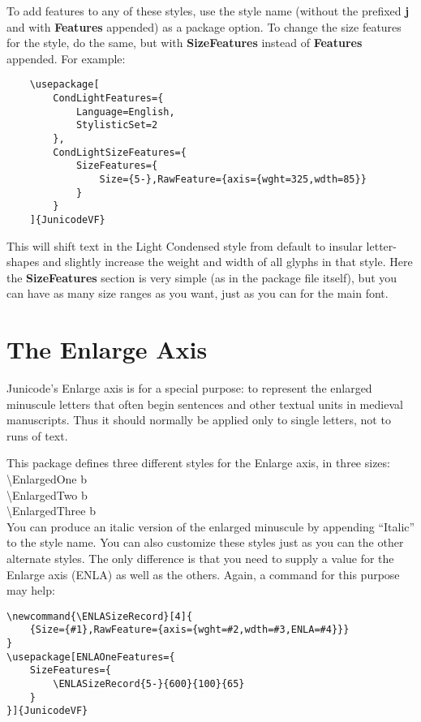 \documentclass[12pt]{article}
\begin{document}
To add features to any of these styles, use the style name
(without the prefixed \textbf{j} and with \textbf{Features} appended)
as a package option. To change the size features for the style,
do the same, but with \textbf{SizeFeatures} instead of \textbf{Features}
appended. For example:

\footnotesize
\begin{verbatim}
    \usepackage[
        CondLightFeatures={
            Language=English,
            StylisticSet=2
        },
        CondLightSizeFeatures={
            SizeFeatures={
                Size={5-},RawFeature={axis={wght=325,wdth=85}}
            }
        }
    ]{JunicodeVF}
\end{verbatim}
\normalsize

\noindent This will shift text in the Light Condensed style from default to insular
letter-shapes and slightly increase the weight and width of all glyphs in that style.
Here the \textbf{SizeFeatures} section is very simple (as in the package file itself),
but you can have as many size ranges as you want, just as you can for the main font.

\section{The Enlarge Axis}

Junicode's Enlarge axis is for a special purpose: to represent the enlarged
minuscule letters that often begin sentences and other textual units in medieval manuscripts.
Thus it should normally be applied only to single letters, not to runs of text.

This package defines three different styles for the Enlarge axis, in three sizes:\\[0.5ex]

\noindent\textbackslash EnlargedOne {\EnlargedOne b}\\
\textbackslash EnlargedTwo {\EnlargedTwo b}\\
\textbackslash EnlargedThree {\EnlargedThree b}\\[0.5ex]

\noindent You can produce an italic version of the enlarged minuscule by appending “Italic” to
the style name. You can also customize these styles just as you can the other alternate
styles. The only difference is that you need to supply a value for the Enlarge axis (ENLA)
as well as the others. Again, a command for this purpose may help:

\footnotesize
\begin{verbatim}
\newcommand{\ENLASizeRecord}[4]{
    {Size={#1},RawFeature={axis={wght=#2,wdth=#3,ENLA=#4}}}
}
\usepackage[ENLAOneFeatures={
    SizeFeatures={
        \ENLASizeRecord{5-}{600}{100}{65}
    }
}]{JunicodeVF}
\end{verbatim}
\normalsize
\end{document}
